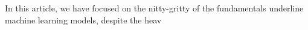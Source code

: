 In this article, we have focused on the nitty-gritty of the fundamentals underline machine learning models, despite the heav
